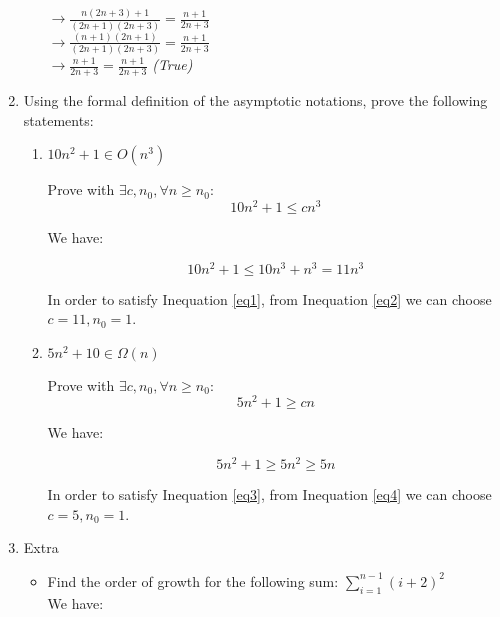 \documentclass[[11pts]{report}
\begin{document}
\begin{enumerate}
\begin{enumerate}
$\to \frac{n(2n+3) + 1}{(2n+1)(2n+3)} = \frac{n+1}{2n+3}$ \\

$\to \frac{(n+1)(2n+1)}{(2n+1)(2n+3)} = \frac{n+1}{2n+3}$ \\

$\to \frac{n+1}{2n+3} = \frac{n+1}{2n+3}$ \textit{(True)} \\





\end{enumerate}

\item Using the formal definition of the asymptotic notations, prove the following statements:
\begin{enumerate}
\item $10n^2 + 1 \in O(n^3)$

Prove with $\exists c, n_0, \forall n \geq n_0$:
\begin{equation}
 10n^2 + 1 \leq cn^3
\label{eq1}
\end{equation}

We have:

\begin{equation}
10n^2 + 1 \leq 10n^3 + n^3 = 11n^3
\label{eq2}
\end{equation}

In order to satisfy Inequation \ref{eq1}, from Inequation \ref{eq2} we can choose $c = 11, n_0 = 1$.

\item $5n^2 + 10 \in \Omega(n)$

Prove with $\exists c, n_0, \forall n \geq n_0$:
\begin{equation}
5n^2 + 1 \geq cn
\label{eq3}
\end{equation}

We have:

\begin{equation}
5n^2 + 1 \geq 5n^2 \geq 5n
\label{eq4}
\end{equation}

In order to satisfy Inequation \ref{eq3}, from Inequation \ref{eq4} we can choose $c = 5, n_0 = 1$.

\end{enumerate}


\item Extra

\begin{itemize}
\item Find the order of growth for the following sum: $\sum_{i=1}^{n-1}(i+2)^2$
\\ We have:


\end{itemize}
\end{enumerate}
\end{document}
